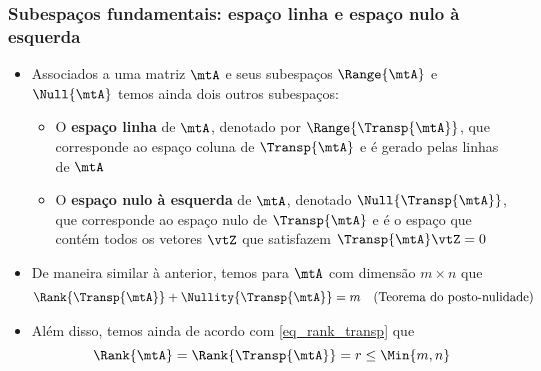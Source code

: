 \begin{frame}
  \frametitle{\normalsize Subespaços fundamentais: espaço linha e espaço nulo à esquerda}
  \begin{itemize}
    \item Associados a uma matriz $\mtA$ e seus subespaços $\Range{\mtA}$ e $\Null{\mtA}$ temos ainda dois outros subespaços:
    \begin{itemize}
      \item O \textbf{\alert{espaço linha}} de $\mtA$, denotado por $\Range{\Transp{\mtA}}$, que corresponde ao espaço coluna de $\Transp{\mtA}$ e é gerado pelas linhas de $\mtA$
      \item O \textbf{\alert{espaço nulo à esquerda}} de $\mtA$, denotado $\Null{\Transp{\mtA}}$, que corresponde ao espaço nulo de $\Transp{\mtA}$ e é o espaço que contém todos os vetores $\vtZ$ que satisfazem $\Transp{\mtA}\vtZ = 0$
    \end{itemize}
    \item De maneira similar à anterior, temos para $\mtA$ com dimensão $m \times n$ que
    \begin{align}
      \Rank{\Transp{\mtA}} + \Nullity{\Transp{\mtA}} &= m & \text{(Teorema do posto-nulidade)}
    \end{align}
    \item Além disso, temos ainda de acordo com \eqref{eq_rank_transp} que
    \begin{equation}
      \Rank{\mtA} = \Rank{\Transp{\mtA}} = r \leq \Min{m,n}
    \end{equation}
  \end{itemize}
\end{frame}

